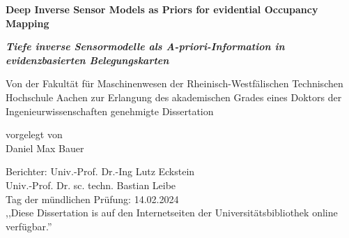 {

\begin{titlepage}
  \centering
  \begin{minipage}[t]{9.8cm}
      \begin{center}
          {\large \textbf{Deep Inverse Sensor Models as Priors for evidential Occupancy Mapping}}
          \bigskip
      \end{center}
  \end{minipage}
  \begin{minipage}[t]{9.8cm}
      \begin{center}
          {\large \textcolor{ikagrey}{\textit{\textbf{Tiefe inverse Sensormodelle als A-priori-Information in evidenzbasierten Belegungskarten}}}}
          \bigskip
      \end{center}
  \end{minipage}
  \vfill
  \begin{minipage}[t]{16.5cm}
      \begin{center}
          Von der Fakultät für Maschinenwesen der Rheinisch-Westfälischen Technischen Hochschule Aachen zur Erlangung des akademischen Grades eines Doktors der Ingenieurwissenschaften genehmigte Dissertation
      \end{center}
  \end{minipage}
  \vfill
  \begin{minipage}[t]{9.8cm}
      \begin{center}
      	vorgelegt von\\
      	\vspace{\baselineskip}
          Daniel Max Bauer
      \end{center}
  \end{minipage}
\vfill
\begin{minipage}[t]{16.5cm}
	\raggedright
	Berichter: Univ.-Prof. Dr.-Ing Lutz Eckstein\\
	\phantom{Berichter:} Univ.-Prof. Dr. sc. techn. Bastian Leibe\\ 
	\vspace{\baselineskip}
	Tag der mündlichen Prüfung: 14.02.2024\\
	\vspace{\baselineskip}
	,,Diese Dissertation is auf den Internetseiten der Universitätsbibliothek online verfügbar.''
\end{minipage}
\vfill
\end{titlepage}
\restoregeometry
}
